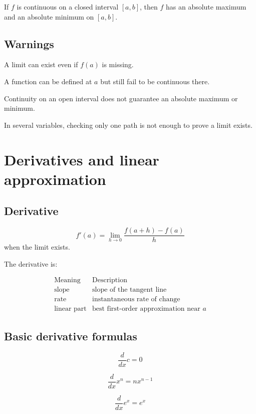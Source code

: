 \begin{theorem}
If \(f\) is continuous on a closed interval \([a,b]\), then \(f\) has an absolute maximum
and an absolute minimum on \([a,b]\).
\end{theorem}

\subsection*{Warnings}

A limit can exist even if \(f(a)\) is missing.

A function can be defined at \(a\) but still fail to be continuous there.

Continuity on an open interval does not guarantee an absolute maximum or minimum.

In several variables, checking only one path is not enough to prove a limit exists.

\section{Derivatives and linear approximation}
\label{app:A.2}

\subsection*{Derivative}

\[
\boxed{
    f'(a)=\lim_{h\to0}\frac{f(a+h)-f(a)}{h}
}
\]
when the limit exists.

The derivative is:

\[
\begin{array}{c|c}
\text{Meaning} & \text{Description} \\ \hline
\text{slope} & \text{slope of the tangent line}\\
\text{rate} & \text{instantaneous rate of change}\\
\text{linear part} & \text{best first-order approximation near }a
\end{array}
\]

\subsection*{Basic derivative formulas}

\[
\frac{d}{dx}c=0
\]

\[
\frac{d}{dx}x^n=nx^{n-1}
\]

\[
\frac{d}{dx}e^x=e^x
\]

